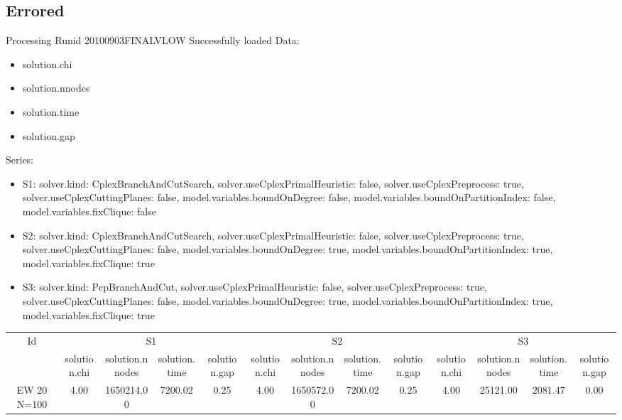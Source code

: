 \documentclass[landscape, 12pt]{report}
\begin{document}
	\subsection{Errored}
	
	Processing Runid 20100903FINALVLOW
 Successfully loaded
Data:
\begin{itemize}
\item solution.chi
\item solution.nnodes
\item solution.time
\item solution.gap
\end{itemize}
Series:
\begin{itemize}
\item S1: solver.kind: CplexBranchAndCutSearch, solver.useCplexPrimalHeuristic: false, solver.useCplexPreprocess: true, solver.useCplexCuttingPlanes: false, model.variables.boundOnDegree: false, model.variables.boundOnPartitionIndex: false, model.variables.fixClique: false
\item S2: solver.kind: CplexBranchAndCutSearch, solver.useCplexPrimalHeuristic: false, solver.useCplexPreprocess: true, solver.useCplexCuttingPlanes: false, model.variables.boundOnDegree: true, model.variables.boundOnPartitionIndex: true, model.variables.fixClique: true
\item S3: solver.kind: PcpBranchAndCut, solver.useCplexPrimalHeuristic: false, solver.useCplexPreprocess: true, solver.useCplexCuttingPlanes: false, model.variables.boundOnDegree: true, model.variables.boundOnPartitionIndex: true, model.variables.fixClique: true
\end{itemize}
\begin{tabular}{|c|cccc|cccc|cccc|}
\hline
\multicolumn{1}{|c|}{Id} & \multicolumn{4}{|c|}{S1} & \multicolumn{4}{|c|}{S2} & \multicolumn{4}{|c|}{S3}
\\
 & solution.chi & solution.nnodes & solution.time & solution.gap & solution.chi & solution.nnodes & solution.time & solution.gap & solution.chi & solution.nnodes & solution.time & solution.gap
\\
\hline
EW 20 N=100 & 4.00 & 1650214.00 & 7200.02 & 0.25 & 4.00 & 1650572.00 & 7200.02 & 0.25 & 4.00 & 25121.00 & 2081.47 & 0.00
\\
\hline 
 \end{tabular}
 
\end{document}

